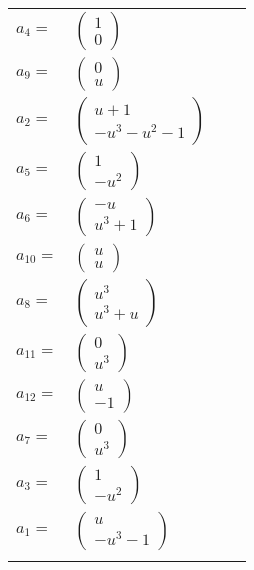 \documentclass[1p]{elsarticle_modified}
\theoremstyle{definition}
\begin{document}
\begin{tabular}{m{7pt} m{180pt} m{7pt} m{180pt} }
\flushright $a_{4}=$&$\begin{pmatrix}1\\0\end{pmatrix}$ \\
\flushright $a_{9}=$&$\begin{pmatrix}0\\u\end{pmatrix}$ \\
\flushright $a_{2}=$&$\begin{pmatrix}u+1\\- u^3- u^2-1\end{pmatrix}$ \\
\flushright $a_{5}=$&$\begin{pmatrix}1\\- u^2\end{pmatrix}$ \\
\flushright $a_{6}=$&$\begin{pmatrix}- u\\u^3+1\end{pmatrix}$ \\
\flushright $a_{10}=$&$\begin{pmatrix}u\\u\end{pmatrix}$ \\
\flushright $a_{8}=$&$\begin{pmatrix}u^3\\u^3+u\end{pmatrix}$ \\
\flushright $a_{11}=$&$\begin{pmatrix}0\\u^3\end{pmatrix}$ \\
\flushright $a_{12}=$&$\begin{pmatrix}u\\-1\end{pmatrix}$ \\
\flushright $a_{7}=$&$\begin{pmatrix}0\\u^3\end{pmatrix}$ \\
\flushright $a_{3}=$&$\begin{pmatrix}1\\- u^2\end{pmatrix}$ \\
\flushright $a_{1}=$&$\begin{pmatrix}u\\- u^3-1\end{pmatrix}$\\&\end{tabular}
\end{document}
